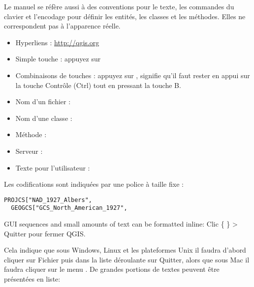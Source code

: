 
Le manuel se réfère aussi à des conventions pour le texte, les commandes du clavier et l'encodage pour définir les entités, les classes et les méthodes. Elles ne correspondent pas à l'apparence réelle.

\begin{itemize}[label=--]
\item Hyperliens : \url{http://qgis.org}
\item Simple touche : appuyez sur 
\item Combinaisons de touches : appuyez sur , signifie qu'il faut rester en appui sur la touche Contrôle (Ctrl) tout en pressant la touche B.
\item Nom d'un fichier : 
\item Nom d'une classe : 
\item Méthode : 
\item Serveur : 
\item Texte pour l'utilisateur : 
\end{itemize}

Les codifications sont indiquées par une police à taille fixe :
\begin{verbatim}
PROJCS["NAD_1927_Albers",
  GEOGCS["GCS_North_American_1927",
\end{verbatim}


GUI sequences and small amounts of text can be formatted inline: Clic
\{\nix{} \} > Quitter pour fermer QGIS. 

Cela indique que sous Windows, Linux et les plateformes Unix il faudra d'abord cliquer sur Fichier puis dans la liste déroulante sur Quitter, alors que sous Mac il faudra cliquer sur le menu \qg. De grandes portions de textes peuvent être présentées en liste:

